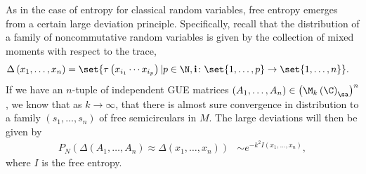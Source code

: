 \documentclass[10pt]{mypackage}
\begin{document}
As in the case of entropy for classical random variables, free entropy emerges from a certain large deviation principle. Specifically, recall that the distribution of a family of noncommutative random variables is given by the collection of mixed moments with respect to the trace,
\begin{align*}
  \Delta\left( x_1,\dots,x_n \right) &= \set{\tau\left( x_{i_1}\cdots x_{i_p} \right) | p\in \N, \mathbf{i}\colon \set{1,\dots,p}\rightarrow \set{1,\dots,n}}.
\end{align*}
If we have an $n$-tuple of independent GUE matrices $\left( A_1,\dots,A_n \right)\in \left( \M_k\left( \C \right)_{\sa} \right)^{n}$, we know that as $k\rightarrow\infty$, that there is almost sure convergence in distribution to a family $\left( s_1,\dots,s_n \right)$ of free semicirculars in $M$. The large deviations will then be given by
\begin{align*}
  P_N\left( \Delta\left( A_1,\dots,A_n \right)\approx \Delta\left( x_1,\dots,x_n \right) \right) &\sim e^{-k^2I\left( x_1,\dots,x_n \right)},
\end{align*}
where $I$ is the free entropy.
\end{document}
